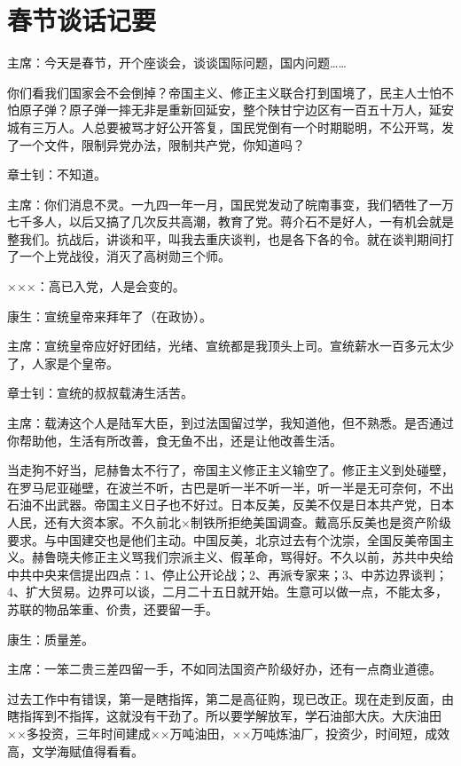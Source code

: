 \section[春节谈话记要（一九六四年二月十三日）]{春节谈话记要}


主席：今天是春节，开个座谈会，谈谈国际问题，国内问题……

你们看我们国家会不会倒掉？帝国主义、修正主义联合打到国境了，民主人士怕不怕原子弹？原子弹一摔无非是重新回延安，整个陕甘宁边区有一百五十万人，延安城有三万人。人总要被骂才好公开答复，国民党倒有一个时期聪明，不公开骂，发了一个文件，限制异党办法，限制共产党，你知道吗？

章士钊：不知道。

主席：你们消息不灵。一九四一年一月，国民党发动了皖南事变，我们牺牲了一万七千多人，以后又搞了几次反共高潮，教育了党。蒋介石不是好人，一有机会就是整我们。抗战后，讲谈和平，叫我去重庆谈判，也是各下各的令。就在谈判期间打了一个上党战役，消灭了高树勋三个师。

×××：高已入党，人是会变的。

康生：宣统皇帝来拜年了（在政协）。

主席：宣统皇帝应好好团结，光绪、宣统都是我顶头上司。宣统薪水一百多元太少了，人家是个皇帝。

章士钊：宣统的叔叔载涛生活苦。

主席：载涛这个人是陆军大臣，到过法国留过学，我知道他，但不熟悉。是否通过你帮助他，生活有所改善，食无鱼不出，还是让他改善生活。

当走狗不好当，尼赫鲁太不行了，帝国主义修正主义输空了。修正主义到处碰壁，在罗马尼亚碰壁，在波兰不听，古巴是听一半不听一半，听一半是无可奈何，不出石油不出武器。帝国主义日子也不好过。日本反美，反美不仅是日本共产党，日本人民，还有大资本家。不久前北×制铁所拒绝美国调查。戴高乐反美也是资产阶级要求。与中国建交也是他们主动。中国反美，北京过去有个沈崇，全国反美帝国主义。赫鲁晓夫修正主义骂我们宗派主义、假革命，骂得好。不久以前，苏共中央给中共中央来信提出四点：1、停止公开论战；2、再派专家来；3、中苏边界谈判；4、扩大贸易。边界可以谈，二月二十五日就开始。生意可以做一点，不能太多，苏联的物品笨重、价贵，还要留一手。

康生：质量差。

主席：一笨二贵三差四留一手，不如同法国资产阶级好办，还有一点商业道德。

过去工作中有错误，第一是瞎指挥，第二是高征购，现已改正。现在走到反面，由瞎指挥到不指挥，这就没有干劲了。所以要学解放军，学石油部大庆。大庆油田××多投资，三年时间建成××万吨油田，××万吨炼油厂，投资少，时间短，成效高，文学海赋值得看看。

